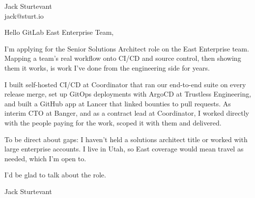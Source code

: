 \documentclass[11pt]{article}
\begin{document}
\raggedright

{\namefont\fontsize{20pt}{24pt}\selectfont Jack Sturtevant}\\[-0.3em]
jack@sturt.io

\vspace{1.2em}

Hello GitLab East Enterprise Team,

I'm applying for the Senior Solutions Architect role on the East Enterprise team. Mapping a team's real workflow onto CI/CD and source control, then showing them it works, is work I've done from the engineering side for years.

I built self-hosted CI/CD at Coordinator that ran our end-to-end suite on every release merge, set up GitOps deployments with ArgoCD at Trustless Engineering, and built a GitHub app at Lancer that linked bounties to pull requests. As interim CTO at Banger, and as a contract lead at Coordinator, I worked directly with the people paying for the work, scoped it with them and delivered.

To be direct about gaps: I haven't held a solutions architect title or worked with large enterprise accounts. I live in Utah, so East coverage would mean travel as needed, which I'm open to.

I'd be glad to talk about the role.

\vspace{0.6em}
Jack Sturtevant
\end{document}
